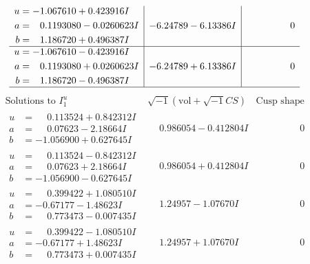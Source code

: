 \documentclass[1p]{elsarticle_modified}
\theoremstyle{definition}
\newcommand{\I}{\sqrt{-1}}
\begin{document}
$$\begin{array}{c|c|c}
\begin{aligned}
u &= -1.067610 + 0.423916 I \\
a &= \phantom{-}0.1193080 - 0.0260623 I \\
b &= \phantom{-}1.186720 + 0.496387 I\end{aligned}
 & -6.24789 - 6.13386 I & \phantom{-0.000000 } 0 \\ \hline\begin{aligned}
u &= -1.067610 - 0.423916 I \\
a &= \phantom{-}0.1193080 + 0.0260623 I \\
b &= \phantom{-}1.186720 - 0.496387 I\end{aligned}
 & -6.24789 + 6.13386 I & \phantom{-0.000000 } 0\\
 \hline 
 \end{array}$$\newpage$$\begin{array}{c|c|c}  
\text{Solutions to }I^u_{1}& \I (\text{vol} + \sqrt{-1}CS) & \text{Cusp shape}\\
 \hline 
\begin{aligned}
u &= \phantom{-}0.113524 + 0.842312 I \\
a &= \phantom{-}0.07623 - 2.18664 I \\
b &= -1.056900 + 0.627645 I\end{aligned}
 & \phantom{-}0.986054 - 0.412804 I & \phantom{-0.000000 } 0 \\ \hline\begin{aligned}
u &= \phantom{-}0.113524 - 0.842312 I \\
a &= \phantom{-}0.07623 + 2.18664 I \\
b &= -1.056900 - 0.627645 I\end{aligned}
 & \phantom{-}0.986054 + 0.412804 I & \phantom{-0.000000 } 0 \\ \hline\begin{aligned}
u &= \phantom{-}0.399422 + 1.080510 I \\
a &= -0.67177 - 1.48623 I \\
b &= \phantom{-}0.773473 - 0.007435 I\end{aligned}
 & \phantom{-}1.24957 - 1.07670 I & \phantom{-0.000000 } 0 \\ \hline\begin{aligned}
u &= \phantom{-}0.399422 - 1.080510 I \\
a &= -0.67177 + 1.48623 I \\
b &= \phantom{-}0.773473 + 0.007435 I\end{aligned}
 & \phantom{-}1.24957 + 1.07670 I & \phantom{-0.000000 } 0 \\ \hline\begin{aligned}

\end{aligned}
\end{array}$$
\end{document}
